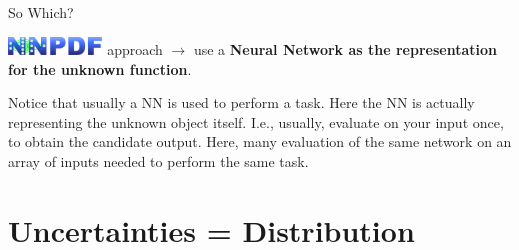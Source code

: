 \documentclass[9pt]{beamer}
\begin{document}
\begin{frame}{So Which?}
    \begin{center}
        \includegraphics[width=2.5cm]{../_logos/nnpdf_logo.pdf} approach $\to$
        use a \textbf{Neural Network as the \alert{representation} for the
        unknown function}.
    \end{center}
    \vspace*{10pt}

    Notice that usually a NN is used to perform a task. Here the NN is actually
    representing the unknown object itself.\newline
    \vspace*{-2pt}
    {\footnotesize
        \hspace*{-5pt}
        I.e., usually, evaluate on your input once, to obtain the candidate
        output. Here, many evaluation of the same network on an array of inputs
        needed to perform the same task.
    }
\end{frame}

\section{Uncertainties = Distribution}
\end{document}
